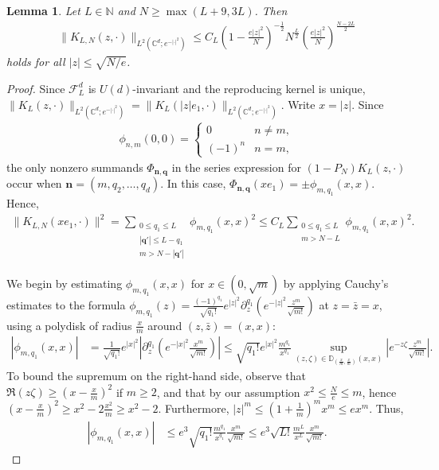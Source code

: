 \documentclass[10pt,a4paper]{amsart}
\newtheorem{lemma}[theorem]{Lemma}
\begin{document}
\begin{lemma}
    \label{lem:tail_bound}
    Let $L \in \mathbb N$ and $N\geq \max(L + 9,3 L)$. Then
    \begin{align*}
        \|K_{L,N}(z,\cdot)\|_{L^2(\mathbb C^d;e^{-|\cdot|^2})} \leq C_{L} \left( 1 - \frac{e|z|^2}{N}\right)^{-\frac12}  N^{\frac L2} \left( \frac{e |z|^2}{ N} \right)^{\frac{N-2L}2}
    \end{align*}
    holds for all $|z| \leq \sqrt{N/e}$.
\end{lemma}

\begin{proof}
    Since $\mathcal F^d_L$ is $U(d)$-invariant and the reproducing kernel is unique, $\| K_L(z,\cdot) \|_{L^2(\mathbb C^d;e^{-|\cdot|^2})} = \| K_L(|z| e_1, \cdot) \|_{L^2(\mathbb C^d;e^{-|\cdot|^2})}$. Write $x = |z|$. Since 
    \begin{align*}
        \phi_{n,m}(0,0) = \begin{cases} 0 & n \neq m, \\
                                                                 (-1)^n & n = m,
                                                    \end{cases}
    \end{align*}
    the only nonzero summands $\Phi_{\mathbf n,\mathbf q}$ in the series expression for $(1-P_{N}) K_L(z,\cdot)$ occur when $\mathbf n = (m,q_2,\ldots,q_d)$. In this case, $\Phi_{\mathbf n,\mathbf q}(x e_1) = \pm\phi_{m,q_1}(x,x)$. Hence,
    \begin{align*}
        \| K_{L,N}(x e_1,\cdot) \|^2 = \sum_{\substack{0 \leq q_1 \leq L \\ |\mathbf q'| \leq L - q_1 \\ m > N-|\mathbf q'|}} \phi_{m,q_1}(x,x)^2 \leq C_L \sum_{\substack{0 \leq q_1 \leq L \\ m > N-L}} \phi_{m,q_1}(x,x)^2.
    \end{align*}

    We begin by estimating $\phi_{m,q_1}(x,x)$ for $x \in (0,\sqrt{m})$ by applying Cauchy's estimates to the formula $\phi_{m,q_1}(z) = \frac{(-1)^{q_1}}{\sqrt{q_1!}} e^{|z|^2} \partial_z^{q_1} (e^{-|z|^2} \frac{z^m}{\sqrt{m!}})$ at $z = \bar z = x$, using a polydisk of radius $\frac{x}{m}$ around $(z,\bar z) = (x,x)$:
    \begin{align*}
        |\phi_{m,q_1}(x,x)| &= \frac{1}{\sqrt{q_1!}} e^{|x|^2} \left| \partial_z^{q_1} (e^{-|x|^2} \frac{x^m}{\sqrt{m!}}) \right| \leq \sqrt{q_1!} e^{|x|^2} \frac{m^{q_1}}{x^{q_1}} \sup_{(z,\zeta) \in \mathbb D_{(\frac xm,\frac xm)}(x,x)}\left| e^{-z \zeta} \frac{z^m}{\sqrt{m!}} \right|.
    \end{align*}
    To bound the supremum on the right-hand side, observe that $\Re(z\zeta) \geq (x-\frac{x}{m})^2$ if $m \geq 2$, and that by our assumption $x^2 \leq \frac{N}{e} \leq m$, hence $(x-\frac{x}{m})^2 \geq x^2 - 2\frac{x^2}{m} \geq x^2 - 2$. Furthermore, $|z|^m \leq (1+\frac1m)^m x^m \leq e x^m$. Thus, 
    \begin{align*}
        |\phi_{m,q_1}(x,x)| &\leq e^3 \sqrt{q_1!} \frac{m^{q_1}}{x^{q_1}} \frac{x^m}{\sqrt{m!}} \leq e^3 \sqrt{L!} \frac{m^{L}}{x^{L}} \frac{x^m}{\sqrt{m!}}.
    \end{align*}
    

\end{proof}
\end{document}
